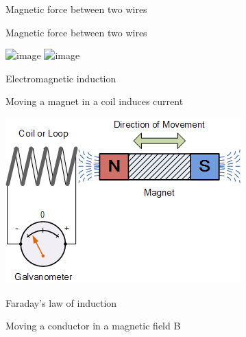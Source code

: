 \documentclass[compress]{beamer}
\begin{document}
{
    \begin{frame}{Magnetic force between two wires}
    \end{frame}
}


\begin{frame}{Magnetic force between two wires}
    \begin{center}
        \includegraphics<1>[width=\linewidth]{parallel-wires}
        \includegraphics<2>[width=\linewidth]{parallel-wires-solution}
    \end{center}
\end{frame}


\begin{frame}{Electromagnetic induction}

  Moving a magnet in a coil induces current


    \begin{center}
        \includegraphics[width=0.6\linewidth]{../part3/figs/image29}


    \end{center}
\end{frame}


{
    \begin{frame}{Faraday's law of induction}
    \end{frame}
}


{
    \begin{frame}{Moving a conductor in a magnetic field B}
    \end{frame}
}
\end{document}
